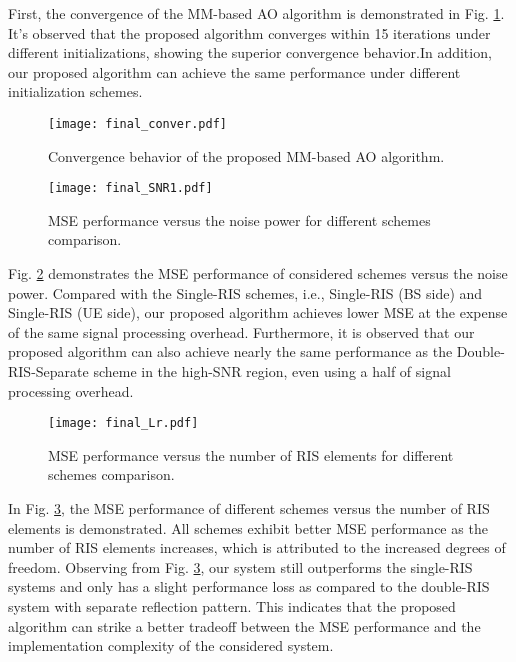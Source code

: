 \documentclass[journal]{IEEEtran}
\begin{document}
{First, the convergence of the MM-based AO algorithm is demonstrated in Fig. \ref{fig_2}. It's observed that the proposed algorithm converges within 15 iterations under different initializations, showing the superior convergence behavior.In addition, our proposed algorithm can achieve the same performance under different initialization schemes.
 \begin{figure}[htbp]
    \centering
    \texttt{[image: final\_conver.pdf]}
    \vspace{-3mm}
    \caption{Convergence behavior of the proposed MM-based AO algorithm.}
    \vspace{-4mm}
   \label{fig_2}
    \end{figure} 
    \begin{figure}[htbp]
    \centering
 

    
    \texttt{[image: final\_SNR1.pdf]}
    \vspace{-3mm}
    \caption{MSE performance versus
   the noise power for different schemes comparison.}
    \vspace{-4mm}
    \label{fig_3}
    \end{figure}
   
 Fig. \ref{fig_3} demonstrates the MSE performance of considered schemes versus the noise power.   
Compared with the Single-RIS schemes, i.e., Single-RIS (BS side) and Single-RIS (UE side), our proposed algorithm achieves lower MSE at the expense of the same signal processing  overhead. Furthermore, it is observed that our proposed algorithm can also achieve nearly 
the same performance as the  Double-RIS-Separate  scheme in the high-SNR region, even using  a half of signal processing overhead.
\vspace{-2mm}

 \begin{figure}[htbp]
    \centering
    \texttt{[image: final\_Lr.pdf]}
   \vspace{-3mm}
    \caption{MSE performance versus
  the number of RIS  elements for different schemes comparison.}
  \vspace{-2mm}
    \label{fig_4}
    \end{figure} 



  
In Fig. \ref{fig_4}, the MSE performance of  different schemes versus
  the number of RIS elements is demonstrated. All schemes exhibit better MSE performance as the number of RIS elements increases, which is attributed to the increased degrees of freedom. Observing from Fig. \ref{fig_4}, our system still outperforms the single-RIS systems and only has a slight performance loss as  compared to the double-RIS system  with separate reflection pattern. This indicates that the proposed  algorithm can strike a better tradeoff between the MSE performance and the implementation complexity of the considered system.
\vspace{-3mm}
}
\end{document}
